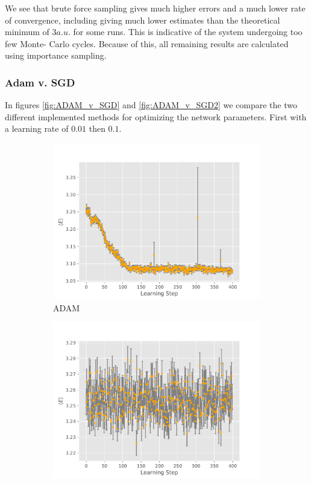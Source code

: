 \documentclass[11pt,a4paper,titlepage]{article}
\begin{document}
We see that brute force sampling gives much higher errors and a much lower rate of convergence, including giving much lower estimates than the theoretical minimum of $3a.u.$ for some runs. This is indicative of the system undergoing too few Monte- Carlo cycles. Because of this, all remaining results are calculated using importance sampling.


\subsubsection{Adam v. SGD}
In figures \ref{fig:ADAM_v_SGD} and \ref{fig:ADAM_v_SGD2} we compare the two different implemented methods for optimizing the network parameters. First with a learning rate of $0.01$ then $0.1$. 

\begin{figure}[H]
\begin{subfigure}[t]{.5\textwidth}
\centering
\includegraphics[trim=0cm 0.0cm 0cm 0cm,scale = 0.5]{D2_P_2I_Y__S_2pow21_eqS_2pow21_GD_ls_v_E_LR_0.010000_NH_3_Adaptive_1.pdf}
\caption{ADAM}
\label{ADAM}
\end{subfigure}
\begin{subfigure}[t]{.5\textwidth}
\centering
\includegraphics[trim=0cm 0.0cm 0cm 0.0cm,scale = 0.5]{D2_P_2I_Y__S_2pow21_eqS_2pow21_GD_ls_v_E_LR_0.010000_NH_3_Adaptive_0.pdf}

\end{subfigure}
\end{figure}
\end{document}
